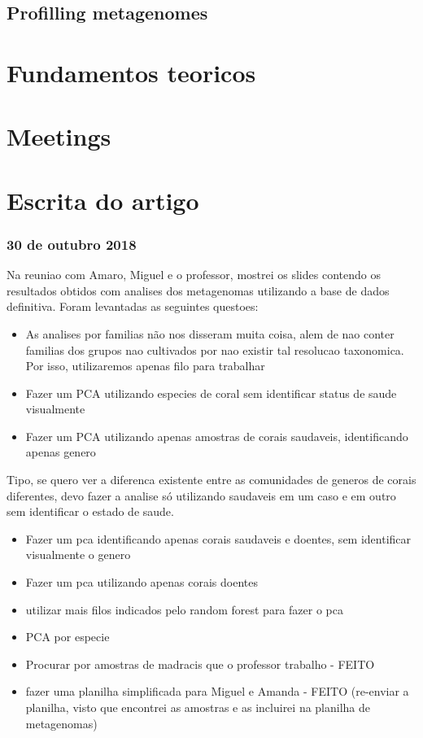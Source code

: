 \documentclass[12pt, a4paper]{report}
\begin{document}
\section{Profilling metagenomes}

\chapter{Fundamentos teoricos}


\chapter{Meetings}

\chapter{Escrita do artigo}

\subsection{30 de outubro 2018}
Na reuniao com Amaro, Miguel e o professor, mostrei os slides contendo os resultados obtidos com analises dos metagenomas utilizando a base de dados definitiva. Foram levantadas as seguintes questoes:
\begin{itemize}
\item As analises por familias não nos disseram muita coisa, alem de nao conter familias dos grupos nao cultivados por nao existir tal resolucao taxonomica. Por isso, utilizaremos apenas filo para trabalhar
\item Fazer um PCA utilizando especies de coral sem identificar status de saude visualmente
\item Fazer um PCA utilizando apenas amostras de corais saudaveis, identificando apenas genero
\end{itemize}
Tipo, se quero ver a diferenca existente entre as comunidades de generos de corais diferentes, devo fazer a analise só utilizando saudaveis em um caso e em outro sem identificar o estado de saude.

\begin{itemize}
\item Fazer um pca identificando apenas corais saudaveis e doentes, sem identificar visualmente o genero 
\item Fazer um pca utilizando apenas corais doentes
\item utilizar mais filos indicados pelo random forest para fazer o pca
\item PCA por especie
\item Procurar por amostras de madracis que o professor trabalho - FEITO
\item fazer uma planilha simplificada para Miguel e Amanda - FEITO (re-enviar a planilha, visto que encontrei as amostras e as incluirei na planilha de metagenomas)
\end{itemize}
\end{document}
